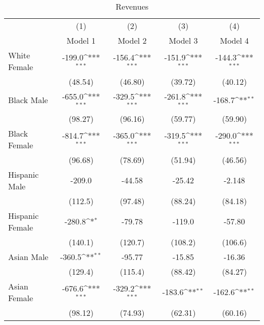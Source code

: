 \begin{table}[htbp]\centering
\def\sym#1{\ifmmode^{#1}\else\(^{#1}\)\fi}
\caption{Revenues}
\begin{tabular}{l*{4}{c}}
\hline\hline
                    &\multicolumn{1}{c}{(1)}&\multicolumn{1}{c}{(2)}&\multicolumn{1}{c}{(3)}&\multicolumn{1}{c}{(4)}\\
                    &\multicolumn{1}{c}{Model 1}&\multicolumn{1}{c}{Model 2}&\multicolumn{1}{c}{Model 3}&\multicolumn{1}{c}{Model 4}\\
\hline
White Female        &      -199.0\sym{***}&      -156.4\sym{***}&      -151.9\sym{***}&      -144.3\sym{***}\\
                    &     (48.54)         &     (46.80)         &     (39.72)         &     (40.12)         \\
[1em]
Black Male          &      -655.0\sym{***}&      -329.5\sym{***}&      -261.8\sym{***}&      -168.7\sym{**} \\
                    &     (98.27)         &     (96.16)         &     (59.77)         &     (59.90)         \\
[1em]
Black Female        &      -814.7\sym{***}&      -365.0\sym{***}&      -319.5\sym{***}&      -290.0\sym{***}\\
                    &     (96.68)         &     (78.69)         &     (51.94)         &     (46.56)         \\
[1em]
Hispanic Male       &      -209.0         &      -44.58         &      -25.42         &      -2.148         \\
                    &     (112.5)         &     (97.48)         &     (88.24)         &     (84.18)         \\
[1em]
Hispanic Female     &      -280.8\sym{*}  &      -79.78         &      -119.0         &      -57.80         \\
                    &     (140.1)         &     (120.7)         &     (108.2)         &     (106.6)         \\
[1em]
Asian Male          &      -360.5\sym{**} &      -95.77         &      -15.85         &      -16.36         \\
                    &     (129.4)         &     (115.4)         &     (88.42)         &     (84.27)         \\
[1em]
Asian Female        &      -676.6\sym{***}&      -329.2\sym{***}&      -183.6\sym{**} &      -162.6\sym{**} \\
                    &     (98.12)         &     (74.93)         &     (62.31)         &     (60.16)         \\

\end{tabular}
\end{table}
